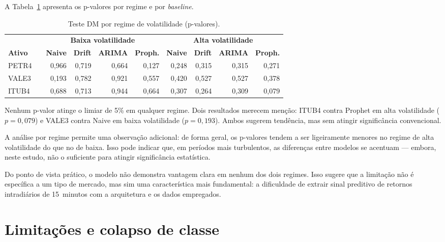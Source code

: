 A Tabela~\ref{tab:dm-regimes} apresenta os p-valores por regime e por \textit{baseline}.

\begin{table}[htbp]
  \centering
  \caption{Teste DM por regime de volatilidade (p-valores).}
  \label{tab:dm-regimes}
  \begin{tabular}{l l r r r r r r r r}
    \toprule
    & & \multicolumn{4}{c}{\textbf{Baixa volatilidade}} & \multicolumn{4}{c}{\textbf{Alta volatilidade}} \\
    \cmidrule(lr){3-6} \cmidrule(lr){7-10}
    \textbf{Ativo} & & \textbf{Naive} & \textbf{Drift} & \textbf{ARIMA} & \textbf{Proph.} & \textbf{Naive} & \textbf{Drift} & \textbf{ARIMA} & \textbf{Proph.} \\
    \midrule
    PETR4 & & 0,966 & 0,719 & 0,664 & 0,127 & 0,248 & 0,315 & 0,315 & 0,271 \\
    VALE3 & & 0,193 & 0,782 & 0,921 & 0,557 & 0,420 & 0,527 & 0,527 & 0,378 \\
    ITUB4 & & 0,688 & 0,713 & 0,944 & 0,664 & 0,307 & 0,264 & 0,309 & 0,079 \\
    \bottomrule
  \end{tabular}
\end{table}

Nenhum p-valor atinge o limiar de 5\% em qualquer regime.
Dois resultados merecem menção: ITUB4 contra Prophet em alta volatilidade
($p = 0{,}079$) e VALE3 contra Naive em baixa volatilidade ($p = 0{,}193$).
Ambos sugerem tendência, mas sem atingir significância convencional.

A análise por regime permite uma observação adicional: de forma geral, os p-valores
tendem a ser ligeiramente menores no regime de alta volatilidade do que no de baixa.
Isso pode indicar que, em períodos mais turbulentos, as diferenças entre modelos se
acentuam --- embora, neste estudo, não o suficiente para atingir significância estatística.

Do ponto de vista prático, o modelo não demonstra vantagem clara em nenhum dos dois regimes.
Isso sugere que a limitação não é específica a um tipo de mercado, mas sim uma característica
mais fundamental: a dificuldade de extrair sinal preditivo de retornos intradiários de
15~minutos com a arquitetura e os dados empregados.

\section{Limitações e colapso de classe}
\label{sec:limitacoes}

